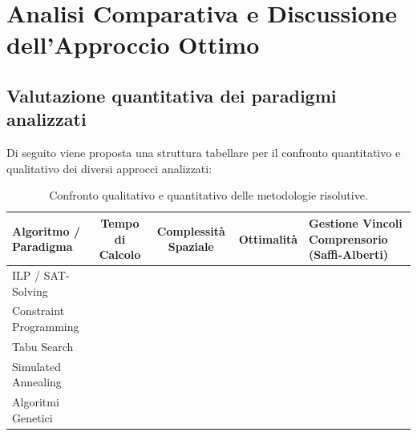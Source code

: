 \chapter{Analisi Comparativa e Discussione dell'Approccio Ottimo}
\label{chap:capitolo4}

\section{Valutazione quantitativa dei paradigmi analizzati}
\label{sec:valutazione_quantitativa}

Di seguito viene proposta una struttura tabellare per il confronto quantitativo e qualitativo dei diversi approcci analizzati:

\begin{table}[htbp]
\centering
\begin{tabular}{|l|c|c|c|p{4cm}|}
\hline
\textbf{Algoritmo / Paradigma} & \textbf{Tempo di Calcolo} & \textbf{Complessità Spaziale} & \textbf{Ottimalità} & \textbf{Gestione Vincoli Comprensorio (Saffi-Alberti)} \\ \hline
ILP / SAT-Solving              &                           &                               &                     &                                                       \\ \hline
Constraint Programming         &                           &                               &                     &                                                       \\ \hline
Tabu Search                    &                           &                               &                     &                                                       \\ \hline
Simulated Annealing            &                           &                               &                     &                                                       \\ \hline
Algoritmi Genetici             &                           &                               &                     &                                                       \\ \hline
\end{tabular}
\caption{Confronto qualitativo e quantitativo delle metodologie risolutive.}
\label{tab:confronto-metodologie}
\end{table}

